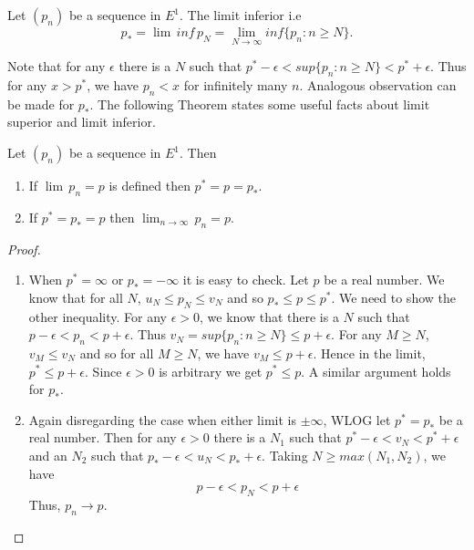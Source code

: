 \begin{Definition}
    Let $(p_n)$ be a sequence in $E^1$. The limit inferior i.e
    \begin{equation*}
	p_{*} = \lim \, inf \, p_N =
	\lim_{N\to\infty}inf\lbrace p_n : n\geq N \rbrace.
    \end{equation*}
\end{Definition}
Note that for any $\epsilon$ there is a $N$ such that $p^{*} - \epsilon < sup\lbrace p_n : n \geq
N\rbrace < p^{*} + \epsilon$. Thus for any $x > p^{*}$, we have $p_n < x$ for infinitely many
$n$. Analogous observation can be made for $p_{*}$. The following Theorem states some useful facts
about limit superior and limit inferior.
\begin{Theorem}
    Let $(p_n)$ be a sequence in $E^1$. Then
    \begin{enumerate}
	\item If $\lim \, p_n = p $ is defined then $p^{*} = p = p_{*}$.
	\item If $p^{*} = p_{*} = p$ then $\lim_{n \to \infty} \, p_n = p$.
    \end{enumerate}
\end{Theorem}
\begin{proof}
    \begin{enumerate}
	\item When $p^{*} = \infty$ or $p_{*} = - \infty$ it is easy to check. Let $p$ be a real
	    number. We know that for all $N$, $u_N \leq p_N \leq v_N$ and so $p_{*} \leq p \leq
	    p^{*}$. We need to show the other inequality. For any $\epsilon > 0$, we know that there
	    is a $N$ such that  $p - \epsilon < p_n  < p + \epsilon$. Thus 
	    $v_N = sup\lbrace p_n : n \geq N\rbrace \leq p + \epsilon$. For any $M \geq N$, $v_M
	    \leq v_N$ and so for all $M \geq N$, we have $v_M \leq p + \epsilon$. Hence in the
	    limit, $p^{*} \leq p + \epsilon$. Since $\epsilon > 0$ is arbitrary we get $p^{*} \leq
	    p$. A similar argument holds for $p_{*}$.  
	\item Again disregarding the case when either limit is $\pm \infty$, WLOG let $p^{*} =
	    p_{*}$ be a real number. Then for any $\epsilon > 0$ there is a $N_1$ such that $p^{*} -
	    \epsilon < v_N < p^{*} + \epsilon$ and an $N_2$ such that $p_{*} - \epsilon < u_N <
	    p_{*} + \epsilon$. Taking $N \geq max(N_1,N_2)$, we have
	    \begin{equation*}
		p -\epsilon < p_N < p + \epsilon
	    \end{equation*}
	    Thus, $p_n \to p$.
    \end{enumerate}
\end{proof}

